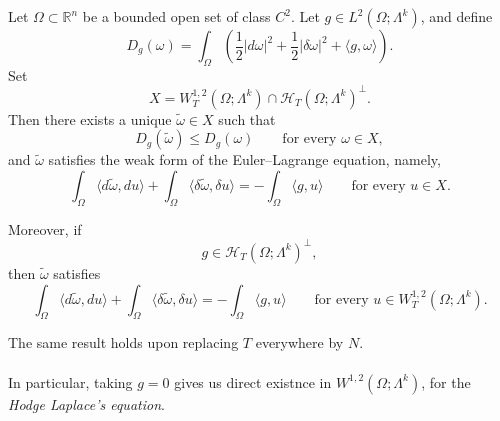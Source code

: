 \begin{theorem}
\label{thm:existence_minimizer}
Let $\Omega\subset\mathbb{R}^n$ be a bounded open set of class $C^2$.
Let $g\in L^2(\Omega;\Lambda^k)$, and define
\[
    D_g(\omega)
    =
    \int_\Omega
    \left(
        \frac12|d\omega|^2
        +
        \frac12|\delta\omega|^2
        +
        \langle g,\omega\rangle
    \right).
\]
Set
\[
    X
    =
    W_T^{1,2}(\Omega;\Lambda^k)
    \cap
    \mathcal{H}_T(\Omega;\Lambda^k)^\perp.
\]
Then there exists a unique $\tilde{\omega}\in X$ such that
\[
    D_g(\tilde{\omega})\leq D_g(\omega)
    \qquad\text{for every }\omega\in X,
\]
and $\tilde{\omega}$ satisfies the weak form of the Euler--Lagrange equation,
namely,
\begin{equation}
\label{eq:6.4}
    \int_\Omega\langle d\tilde\omega,du\rangle
    +
    \int_\Omega\langle\delta\tilde\omega,\delta u\rangle
    =
    -\int_\Omega\langle g,u\rangle
    \qquad\text{for every }u\in X.
\end{equation}

Moreover, if
\[
    g\in\mathcal{H}_T(\Omega;\Lambda^k)^\perp,
\]
then $\tilde\omega$ satisfies
\begin{equation}
\label{eq:6.5}
    \int_\Omega\langle d\tilde\omega,du\rangle
    +
    \int_\Omega\langle\delta\tilde\omega,\delta u\rangle
    =
    -\int_\Omega\langle g,u\rangle
    \qquad\text{for every }
    u\in W_T^{1,2}(\Omega;\Lambda^k).
\end{equation}

The same result holds upon replacing $T$ everywhere
by $N$.
\\\\ In particular, taking $g=0$ gives us direct existnce in $W^{1,2}(\Omega;\Lambda^k)$, for the \emph{Hodge Laplace's equation}. 
\end{theorem}

